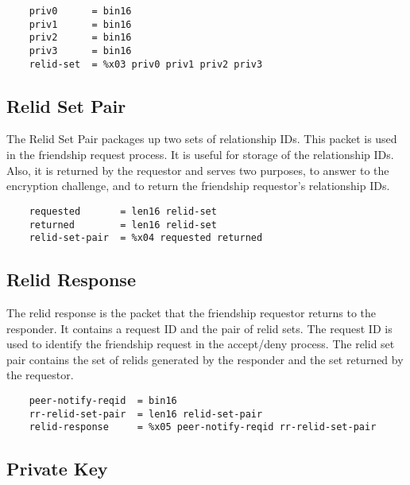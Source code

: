 \documentclass[letterpaper,11pt,oneside]{article}
\begin{document}
\vspace{10pt}
\begin{verbatim}
    priv0      = bin16
    priv1      = bin16
    priv2      = bin16
    priv3      = bin16
    relid-set  = %x03 priv0 priv1 priv2 priv3
\end{verbatim}
\vspace{10pt}

\subsection{Relid Set Pair}

The Relid Set Pair packages up two sets of relationship IDs. This packet is
used in the friendship request process. It is useful for storage of the
relationship IDs. Also, it is returned by the requestor and serves two
purposes, to answer to the encryption challenge, and to return the friendship
requestor's relationship IDs.

\vspace{10pt}
\begin{verbatim}
    requested       = len16 relid-set
    returned        = len16 relid-set
    relid-set-pair  = %x04 requested returned
\end{verbatim}
\vspace{10pt}

\subsection{Relid Response}

The relid response is the packet that the friendship requestor returns to the
responder. It contains a request ID and the pair of relid sets. The request ID
is used to identify the friendship request in the accept/deny process. The
relid set pair contains the set of relids generated by the responder and the
set returned by the requestor.

\vspace{10pt}
\begin{verbatim}
    peer-notify-reqid  = bin16
    rr-relid-set-pair  = len16 relid-set-pair
    relid-response     = %x05 peer-notify-reqid rr-relid-set-pair
\end{verbatim}
\vspace{10pt}

\subsection{Private Key}
\end{document}
